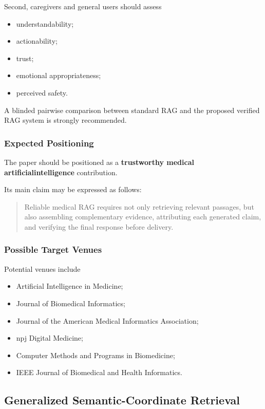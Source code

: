 \documentclass{article}
\begin{document}
Second, caregivers and general users should assess
\begin{itemize}
    \item understandability;
    \item actionability;
    \item trust;
    \item emotional appropriateness;
    \item perceived safety.
\end{itemize}

A blinded pairwise comparison between standard RAG and the proposed verified
RAG system is strongly recommended.

\subsubsection{Expected Positioning}

The paper should be positioned as a \textbf{trustworthy medical artificialintelligence} contribution.

Its main claim may be expressed as follows:
\begin{quote}
Reliable medical RAG requires not only retrieving relevant passages, but also
assembling complementary evidence, attributing each generated claim, and
verifying the final response before delivery.
\end{quote}

\subsubsection{Possible Target Venues}

Potential venues include
\begin{itemize}
    \item Artificial Intelligence in Medicine;
    \item Journal of Biomedical Informatics;
    \item Journal of the American Medical Informatics Association;
    \item npj Digital Medicine;
    \item Computer Methods and Programs in Biomedicine;
    \item IEEE Journal of Biomedical and Health Informatics.
\end{itemize}

\subsection{Generalized Semantic-Coordinate Retrieval}
\end{document}
